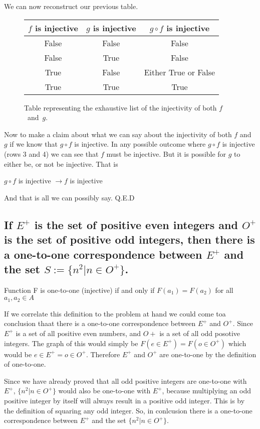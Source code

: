 We can now reconstruct our previous table.
\begin{figure}[H]
  \begin{center}
    \begin{tabular}{|c|c|c|}
      \hline
      $f$ is injective & $g$ is injective & $g \circ f$ is injective \\
      \hline
      False & False & False \\
      False & True & False \\
      True & False & Either True or False \\
      True & True & True \\
      \hline
    \end{tabular}
  \end{center}
  \caption{Table representing the exhaustive list of the injectivity of both $f$~and~$g$.}
  \label{tab:injectiveFilled}
\end{figure}

Now to make a claim about what we can say about the injectivity of both $f$ and $g$ if we know that $g \circ f$ is injective. In any possible outcome where $g \circ f$ is injective (rows 3 and 4) we can see that $f$ must be injective. But it is possible for $g$ to either be, or not be injective. That is
\begin{center}
  $g \circ f$ is injective $\rightarrow f$ is injective
\end{center}

And that is all we can possibly say. Q.E.D

\newpage
\subsection{If $E^+$ is the set of positive even integers and $O^+$ is the set of positive odd integers, then there
is a one-to-one correspondence between $E^+$ and the set $S := \{n^2 |n \in O^+\}$.}

\begin{definition}
  Function F is one-to-one (injective) if and only if $F(a_1) = F(a_2)$ for all $a_1,a_2 \in A$
\end{definition}

If we correlate this definition to the problem at hand we could come toa  conclusion thaat there is a one-to-one correspondence between $E^+$ and $O^+$. Since $E^+$ is a set of all positive even numbers, and $O+$ is a set of all odd posotive integers. The graph of this would simply be $F(e \in E^+) = F(o \in O^+)$ which would be $e \in E^+ = o \in O^+$. Therefore $E^+$ and $O^+$ are one-to-one by the definition of one-to-one.

Since we have already proved that all odd positive integers are one-to-one with $E^+$, $\{ n^2 | n \in O^+\}$ would also be one-to-one with $E^+$, because multiplying an odd positive integer by itself will always result in a positive odd integer. This is by the definition of squaring any odd integer. So, in conlcusion there is a one-to-one correspondence between $E^+$ and the set $\{ n^2 | n \in O^+\}$.

